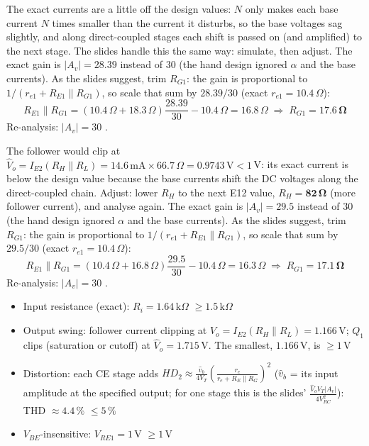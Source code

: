 \documentclass[11pt]{article}
\begin{document}
The exact currents are a little off the design values: $N$ only makes each base current $N$ times smaller than the current it disturbs, so the base voltages sag slightly, and along direct-coupled stages each shift is passed on (and amplified) to the next stage. The slides handle this the same way: simulate, then adjust. The exact gain is $|A_v| = 28.39$ instead of $30$ (the hand design ignored $\alpha$ and the base currents). As the slides suggest, trim $R_{G1}$: the gain is proportional to $1/(r_{e1} + R_{E1}\|R_{G1})$, so scale that sum by $28.39/30$ (exact $r_{e1} = 10.4\,\Omega$):\[R_{E1}\|R_{G1} = (10.4\,\Omega + 18.3\,\Omega)\frac{28.39}{30} - 10.4\,\Omega = 16.8\,\Omega \;\Rightarrow\; R_{G1} = \mathbf{17.6\,\Omega}\]Re-analysis: $|A_v| = 30$ \checkmark. \par The follower would clip at $\hat V_o = I_{E2}(R_H\|R_L) = 14.6\,\mathrm{m}\mathrm{A}\times66.7\,\Omega = 0.9743\,\mathrm{V} < 1$\,V: its exact current is below the design value because the base currents shift the DC voltages along the direct-coupled chain. Adjust: lower $R_H$ to the next E12 value, $R_H = \mathbf{82\,\Omega}$ (more follower current), and analyse again. The exact gain is $|A_v| = 29.5$ instead of $30$ (the hand design ignored $\alpha$ and the base currents). As the slides suggest, trim $R_{G1}$: the gain is proportional to $1/(r_{e1} + R_{E1}\|R_{G1})$, so scale that sum by $29.5/30$ (exact $r_{e1} = 10.4\,\Omega$):\[R_{E1}\|R_{G1} = (10.4\,\Omega + 16.8\,\Omega)\frac{29.5}{30} - 10.4\,\Omega = 16.3\,\Omega \;\Rightarrow\; R_{G1} = \mathbf{17.1\,\Omega}\]Re-analysis: $|A_v| = 30$ \checkmark. \begin{itemize}[leftmargin=*,itemsep=2pt]
\item Input resistance (exact): $R_i = 1.64\,\mathrm{k}\Omega$ $\ge 1.5\,\mathrm{k}\Omega$ \checkmark
\item Output swing: follower current clipping at $\hat V_o = I_{E2}(R_H\|R_L) = 1.166\,\mathrm{V}$; $Q_{1}$ clips (saturation or cutoff) at $\hat V_o = 1.715\,\mathrm{V}$. The smallest, $1.166\,\mathrm{V}$, is $\ge 1$\,V \checkmark
\item Distortion: each CE stage adds $HD_2 \approx \frac{\hat v_b}{4V_T}\left(\frac{r_e}{r_e + R_E\|R_G}\right)^2$ ($\hat v_b$ = its input amplitude at the specified output; for one stage this is the slides' $\frac{\hat V_o V_T |A_v|}{4V_{RC}^2}$): THD $\approx 4.4\,\%$ $\le 5\,\%$ \checkmark
\item $V_{BE}$-insensitive: $V_{RE1} = 1$\,V $\ge 1$\,V \checkmark
\end{itemize}
\end{document}
